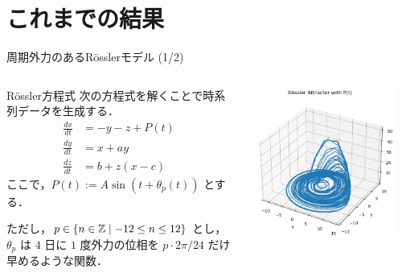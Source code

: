 \section{これまでの結果}


\begin{frame}{周期外力のあるRösslerモデル (1/2)}
    \begin{columns}[T] %
  
      \begin{column}{.5\textwidth}
        \begin{block}{Rössler方程式}
            次の方程式を解くことで時系列データを生成する．
            \begin{align}
                \frac{dx}{dt} &= -y - z + P(t)\\
                \frac{dy}{dt} &= x + ay \\
                \frac{dz}{dt} &= b + z(x - c)
            \end{align}
            ここで，$P(t) := A \sin(t + \theta_p(t))$ とする．
           
            ただし，$p \in \left\{ n \in \mathbb{Z} \mid -12 \leq n \leq 12 \right\}$ とし，
            $\theta_p$ は $4$ 日に $1$ 度外力の位相を $p\cdot 2\pi/24$ だけ早めるような関数．
        \end{block}
      \end{column}
      \begin{column}{.5\textwidth}
        \includegraphics[width=0.9\textwidth]{Fig/NEWrossler_attractor.png}
      \end{column}
    \end{columns}
  \end{frame}

